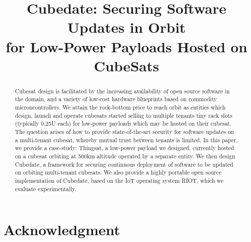 \documentclass[conference]{IEEEtran}
\begin{document}

\title{Cubedate: Securing Software Updates in Orbit \\ for Low-Power Payloads Hosted on CubeSats}

\author{
}

\maketitle

\begin{abstract}

Cubesat design is facilitated by the increasing availability of open source software in the domain, and a variety of low-cost hardware blueprints based on commodity microncontrollers.
We attain the rock-bottom price to reach orbit as entities which design, launch and operate cubesats started selling to multiple tenants tiny rack slots (typically 0,25U each) for low-power payloads which may be hosted on their cubesat.
The question arises of how to provide state-of-the-art security for software updates on a multi-tenant cubesat, whereby mutual trust between tenants is limited.
In this paper, we provide a case-study: Thingsat, a low-power payload we designed, currently hosted on a cubesat orbiting at 500km altitude operated by a separate entity.
We then design Cubedate, a framework for securing continuous deployment of software to be updated on orbiting multi-tenant cubesats.
We also provide a highly portable open source implementation of Cubedate, based on the IoT operating system RIOT, which we evaluate experimentally.%
\end{abstract}

\IEEEpeerreviewmaketitle









\section*{Acknowledgment}



\end{document}
